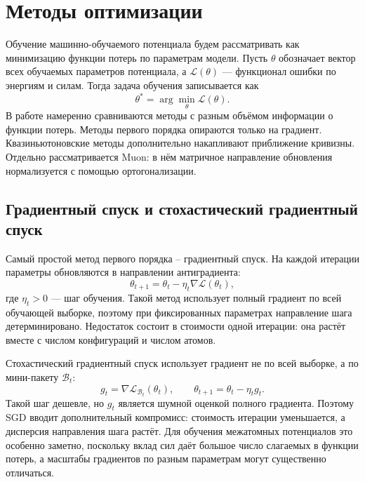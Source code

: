 \section{Методы оптимизации}
\label{sec:methods}

Обучение машинно-обучаемого потенциала будем рассматривать как минимизацию функции потерь по параметрам модели. Пусть \(\theta\) обозначает вектор всех обучаемых параметров потенциала, а \(\mathcal L(\theta)\) --- функционал ошибки по энергиям и силам. Тогда задача обучения записывается как
\begin{equation}
    \theta^\ast
    =
    \arg\min_{\theta}
    \mathcal L(\theta).
\end{equation}
В работе намеренно сравниваются методы с разным объёмом информации о функции потерь. Методы первого порядка опираются только на градиент. Квазиньютоновские методы дополнительно накапливают приближение кривизны. Отдельно рассматривается Muon: в нём матричное направление обновления нормализуется с помощью ортогонализации.

\subsection{Градиентный спуск и стохастический градиентный спуск}

Самый простой метод первого порядка -- градиентный спуск. На каждой итерации параметры обновляются в направлении антиградиента:
\begin{equation}
    \theta_{t+1}
    =
    \theta_t
    -
    \eta_t
    \nabla \mathcal L(\theta_t),
\end{equation}
где \(\eta_t>0\) --- шаг обучения. Такой метод использует полный градиент по всей обучающей выборке, поэтому при фиксированных параметрах направление шага детерминировано. Недостаток состоит в стоимости одной итерации: она растёт вместе с числом конфигураций и числом атомов.

Стохастический градиентный спуск использует градиент не по всей выборке, а по мини-пакету \(\mathcal B_t\):
\begin{equation}
    g_t
    =
    \nabla
    \mathcal L_{\mathcal B_t}(\theta_t),
    \qquad
    \theta_{t+1}
    =
    \theta_t
    -
    \eta_t g_t.
\end{equation}
Такой шаг дешевле, но \(g_t\) является шумной оценкой полного градиента. Поэтому SGD вводит дополнительный компромисс: стоимость итерации уменьшается, а дисперсия направления шага растёт. Для обучения межатомных потенциалов это особенно заметно, поскольку вклад сил даёт большое число слагаемых в функции потерь, а масштабы градиентов по разным параметрам могут существенно отличаться.

